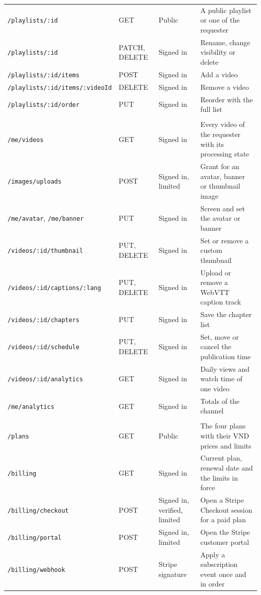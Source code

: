 \begin{footnotesize}
\begin{longtable}{>{\raggedright\arraybackslash}p{} >{\raggedright\arraybackslash}p{} >{\raggedright\arraybackslash}p{} >{\raggedright\arraybackslash}p{}}
\texttt{/playlists/:id} & GET & Public & A public playlist or one of the requester \\
\texttt{/playlists/:id} & PATCH, DELETE & Signed in & Rename, change visibility or delete \\
\texttt{/playlists/:id/items} & POST & Signed in & Add a video \\
\texttt{/playlists/:id/items/:videoId} & DELETE & Signed in & Remove a video \\
\texttt{/playlists/:id/order} & PUT & Signed in & Reorder with the full list \\
\midrule
\multicolumn{4}{l}{\textit{Studio}} \\
\texttt{/me/videos} & GET & Signed in & Every video of the requester with its processing state \\
\texttt{/images/uploads} & POST & Signed in, limited & Grant for an avatar, banner or thumbnail image \\
\texttt{/me/avatar}, \texttt{/me/banner} & PUT & Signed in & Screen and set the avatar or banner \\
\texttt{/videos/:id/thumbnail} & PUT, DELETE & Signed in & Set or remove a custom thumbnail \\
\texttt{/videos/:id/captions/:lang} & PUT, DELETE & Signed in & Upload or remove a WebVTT caption track \\
\texttt{/videos/:id/chapters} & PUT & Signed in & Save the chapter list \\
\texttt{/videos/:id/schedule} & PUT, DELETE & Signed in & Set, move or cancel the publication time \\
\texttt{/videos/:id/analytics} & GET & Signed in & Daily views and watch time of one video \\
\texttt{/me/analytics} & GET & Signed in & Totals of the channel \\
\midrule
\multicolumn{4}{l}{\textit{Plans and billing}} \\
\texttt{/plans} & GET & Public & The four plans with their VND prices and limits \\
\texttt{/billing} & GET & Signed in & Current plan, renewal date and the limits in force \\
\texttt{/billing/checkout} & POST & Signed in, verified, limited & Open a Stripe Checkout session for a paid plan \\
\texttt{/billing/portal} & POST & Signed in, limited & Open the Stripe customer portal \\
\texttt{/billing/webhook} & POST & Stripe signature & Apply a subscription event once and in order \\

\end{longtable}
\end{footnotesize}
